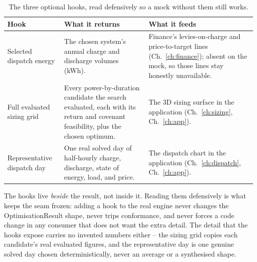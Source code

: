 \begin{table}[H]
\centering
\caption{The three optional hooks, read defensively so a mock without them still works.}
\label{tab:hooks}
\small\sffamily
\begin{tabularx}{\textwidth}{@{}l L L@{}}
\toprule
\textbf{Hook} & \textbf{What it returns} & \textbf{What it feeds} \\
\midrule
Selected dispatch energy & The chosen system's annual charge and discharge volumes (kWh). & Finance's levies-on-charge and price-to-target lines (Ch.~\ref{ch:finance}); absent on the mock, so those lines stay honestly unavailable. \\
Full evaluated sizing grid & Every power-by-duration candidate the search evaluated, each with its return and covenant feasibility, plus the chosen optimum. & The 3D sizing surface in the application (Ch.~\ref{ch:sizing}, Ch.~\ref{ch:app}). \\
Representative dispatch day & One real solved day of half-hourly charge, discharge, state of energy, load, and price. & The dispatch chart in the application (Ch.~\ref{ch:dispatch}, Ch.~\ref{ch:app}). \\
\bottomrule
\end{tabularx}
\end{table}

\begin{caution}
The hooks live \emph{beside} the result, not inside it. Reading them defensively is what keeps the seam frozen: adding a hook to the real engine never changes the OptimisationResult shape, never trips conformance, and never forces a code change in any consumer that does not want the extra detail. The detail that the hooks expose carries no invented numbers either -- the sizing grid copies each candidate's real evaluated figures, and the representative day is one genuine solved day chosen deterministically, never an average or a synthesised shape.
\end{caution}

